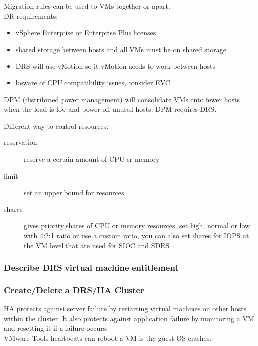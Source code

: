 Migration rules can be used to VMs together or apart.\\

DR requirements:

\begin{itemize}
\item vSphere Enterprise or Enterprise Plus licenses
\item shared storage between hosts and all VMs must be on shared storage
\item DRS will use vMotion so it vMotion needs to work between hosts
\item beware of CPU compatibility issues, consider EVC
\end{itemize}

DPM (distributed power management) will consolidate VMs onto fewer hosts when
the load is low and power off unused hosts. DPM requires DRS.

Different way to control resources:

\begin{description}

\item[reservation]
reserve a certain amount of CPU or memory

\item[limit]
set an upper bound for resources

\item[shares]
gives priority shares of CPU or memory resources, set high, normal or low
with 4:2:1 ratio or use a custom ratio, you can also set shares for IOPS
at the VM level that are used for SIOC and SDRS

\end{description}

\subsubsection{Describe DRS virtual machine entitlement}

\subsubsection{Create/Delete a DRS/HA Cluster}

HA protects against server failure by restarting virtual machines on other
hosts within the cluster. It also protects against application failure by
monitoring a VM and resetting it if a failure occurs.\\

VMware Tools heartbeats can reboot a VM is the guest OS crashes.\\

